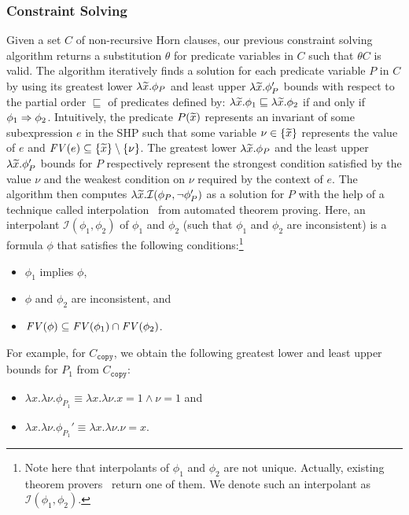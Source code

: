 \subsubsection{Constraint Solving}
\label{sec:cs}

Given a set \(C\) of non-recursive Horn clauses, our previous constraint 
solving algorithm returns a substitution \(\theta\) for predicate 
variables in \(C\) such that \(\theta C\) is valid.
The algorithm iteratively finds a solution for each predicate variable 
\(P\) in \(C\) by using its greatest lower \(\lambda \widetilde{x}.\phi_{P}\) 
and least upper \(\lambda \widetilde{x}.\phi_{P}'\) bounds with respect to the 
partial order \(\sqsubseteq\) of predicates defined by: \(\lambda 
\widetilde{x}.\phi_1 \sqsubseteq \lambda \widetilde{x}.\phi_2\) if and only if 
\(\phi_1 \Rightarrow \phi_2\).  
%
Intuitively, the predicate \(P(\widetilde{x})\) represents an invariant of 
some subexpression \(e\) in the SHP such that some variable \(\nu \in 
\{{\widetilde{x}}\}\) represents the value of \(e\) and \(\mathit{FV}({e}) \subseteq 
\{{\widetilde{x}}\} \setminus \{{\nu}\}\).  The greatest lower \(\lambda 
\widetilde{x}.\phi_P\) and the least upper \(\lambda \widetilde{x}.\phi_{P}'\) 
bounds for \(P\) respectively represent the strongest condition 
satisfied by the value \(\nu\) and the weakest condition on \(\nu\) 
required by the context of \(e\).
%
The algorithm then computes \(\lambda \widetilde{x}.\mathcal{I}(\phi_P,\neg 
\phi_P')\) as a solution for \(P\) with the help of a technique called 
interpolation~\cite{Henzinger2004,McMillan2005} from automated theorem 
proving.  Here, an interpolant \(\mathcal{I}(\phi_1,\phi_2)\) of 
\(\phi_1\) and \(\phi_2\) (such that \(\phi_1\) and \(\phi_2\) are 
inconsistent) is a formula \(\phi\) that satisfies the following 
conditions:\footnote{Note here that interpolants of \(\phi_1\) and 
\(\phi_2\) are not unique.  Actually, existing theorem 
provers~\cite{Henzinger2004,McMillan2005,Beyer2008} return one of them. 
We denote such an interpolant as \(\mathcal{I}(\phi_1,\phi_2)\).}
\begin{itemize}
\item \(\phi_1\) implies \(\phi\),
\item \(\phi\) and \(\phi_2\) are inconsistent, and
\item \(\mathit{FV}({\phi}) \subseteq \mathit{FV}({\phi_1}) \cap \mathit{FV}({\phi_2})\).
\end{itemize}
%
For example, for \(C_{\texttt{copy}}\), we obtain the following greatest 
lower and least upper bounds for \(P_1\) from \(C_{\texttt{copy}}\):
\begin{itemize}
\item \(\lambda x.\lambda \nu.\phi_{P_1}\equiv \lambda x.\lambda \nu.x=1 \land \nu=1\) and
\item \(\lambda x.\lambda \nu.\phi_{P_1}'\equiv \lambda x.\lambda \nu.\nu=x\).
\end{itemize}
